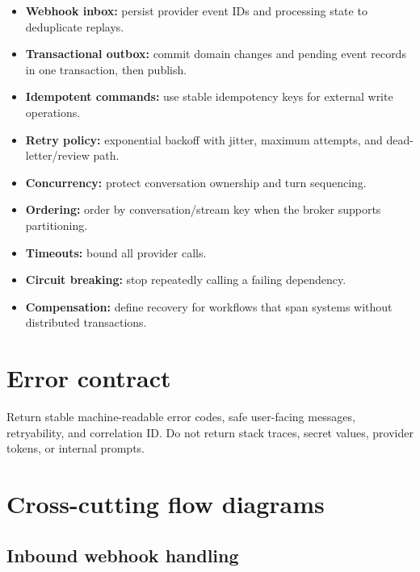 \begin{itemize}
\item \textbf{Webhook inbox:} persist provider event IDs and processing state to deduplicate replays.
\item \textbf{Transactional outbox:} commit domain changes and pending event records in one transaction, then publish.
\item \textbf{Idempotent commands:} use stable idempotency keys for external write operations.
\item \textbf{Retry policy:} exponential backoff with jitter, maximum attempts, and dead-letter/review path.
\item \textbf{Concurrency:} protect conversation ownership and turn sequencing.
\item \textbf{Ordering:} order by conversation/stream key when the broker supports partitioning.
\item \textbf{Timeouts:} bound all provider calls.
\item \textbf{Circuit breaking:} stop repeatedly calling a failing dependency.
\item \textbf{Compensation:} define recovery for workflows that span systems without distributed transactions.
\end{itemize}
\section{Error contract}

Return stable machine-readable error codes, safe user-facing messages, retryability, and correlation ID. Do not return stack traces, secret values, provider tokens, or internal prompts.

\section{Cross-cutting flow diagrams}
\Needspace{640pt}
\subsection{Inbound webhook handling}





